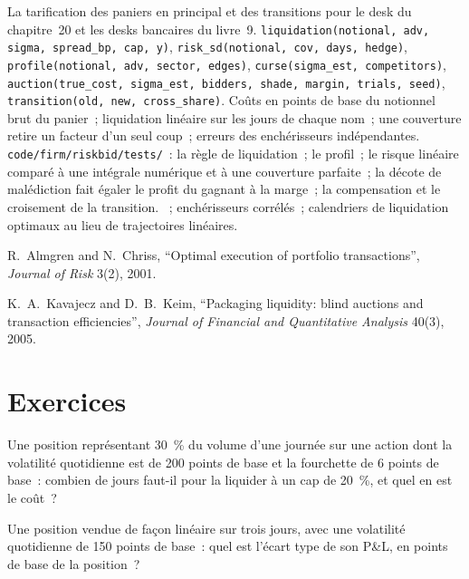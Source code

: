 \begin{build}
 La tarification des paniers en principal et des transitions pour le desk du chapitre~20 et les desks bancaires du livre~9.
 \texttt{liquidation(notional, adv, sigma, spread\_bp, cap, y)}, \texttt{risk\_sd(notional, cov, days, hedge)},
\texttt{profile(notional, adv, sector, edges)}, \texttt{curse(sigma\_est, competitors)},
\texttt{auction(true\_cost, sigma\_est, bidders, shade, margin, trials, seed)}, \texttt{transition(old, new, cross\_share)}.
 Coûts en points de base du notionnel brut du panier~; liquidation linéaire sur les jours de chaque nom~; une couverture retire un facteur
d'un seul coup~; erreurs des enchérisseurs indépendantes.
 \texttt{code/firm/riskbid/tests/}~: la règle de liquidation~; le profil~; le risque linéaire comparé à une intégrale numérique
et à une couverture parfaite~; la décote de malédiction fait égaler le profit du gagnant à la marge~; la compensation et le croisement de la transition.
 ~; enchérisseurs corrélés~; calendriers de liquidation optimaux au lieu de trajectoires linéaires.
\end{build}

\begin{omsources}
\item R.~Almgren and N.~Chriss, ``Optimal execution of portfolio transactions'', \emph{Journal of Risk} 3(2), 2001.
\item K.~A.~Kavajecz and D.~B.~Keim, ``Packaging liquidity: blind auctions and transaction efficiencies'', \emph{Journal of Financial and
Quantitative Analysis} 40(3), 2005.
\end{omsources}

\section{Exercices}

\begin{exercise}[$\star$]\label{exo:mx:portfolio-trades-and-risk-bids:1}
Une position représentant 30~\% du volume d'une journée sur une action dont la volatilité quotidienne est de 200 points de base et la fourchette de 6 points de base~: combien de jours faut-il pour la liquider à
un cap de 20~\%, et quel en est le coût~?
\end{exercise}

\begin{exercise}[$\star$]\label{exo:mx:portfolio-trades-and-risk-bids:2}
Une position vendue de façon linéaire sur trois jours, avec une volatilité quotidienne de 150 points de base~: quel est l'écart type de son P\&L, en
points de base de la position~?
\end{exercise}

